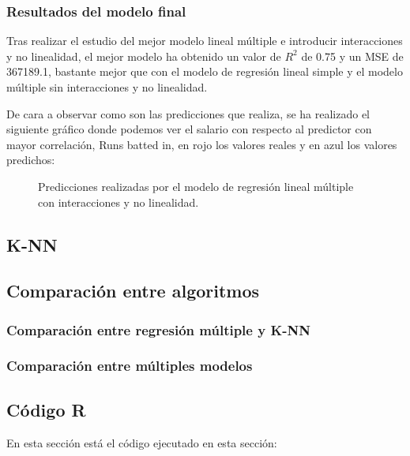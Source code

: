 \newpage

\subsubsection{Resultados del modelo final}

Tras realizar el estudio del mejor modelo lineal múltiple e introducir interacciones y no linealidad, el mejor modelo ha obtenido un valor de $R^2$ de 0.75 y un MSE de 367189.1, bastante mejor que con el modelo de regresión lineal simple y el modelo múltiple sin interacciones y no linealidad.

De cara a observar como son las predicciones que realiza, se ha realizado el siguiente gráfico donde podemos ver el salario con respecto al predictor con mayor correlación, Runs batted in, en rojo los valores reales y en azul los valores predichos:

\begin{figure}[H]
	\centering
	
	\caption{Predicciones realizadas por el modelo de regresión lineal múltiple con interacciones y no linealidad.}
	\label{fig:predicciones_lm_completo}
\end{figure}

\subsection{K-NN}

\subsection{Comparación entre algoritmos}

\subsubsection{Comparación entre regresión múltiple y K-NN}

\subsubsection{Comparación entre múltiples modelos}


\subsection{Código R}

En esta sección está el código ejecutado en esta sección:

